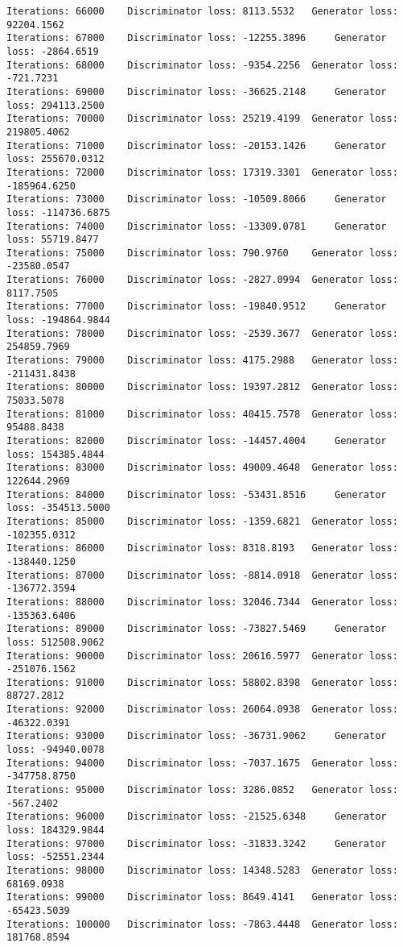 \documentclass[11pt]{article}
\begin{document}
\begin{Verbatim}[commandchars=\\\{\}]
Iterations: 66000	 Discriminator loss: 8113.5532	 Generator loss: 92204.1562
Iterations: 67000	 Discriminator loss: -12255.3896	 Generator loss: -2864.6519
Iterations: 68000	 Discriminator loss: -9354.2256	 Generator loss: -721.7231
Iterations: 69000	 Discriminator loss: -36625.2148	 Generator loss: 294113.2500
Iterations: 70000	 Discriminator loss: 25219.4199	 Generator loss: 219805.4062
Iterations: 71000	 Discriminator loss: -20153.1426	 Generator loss: 255670.0312
Iterations: 72000	 Discriminator loss: 17319.3301	 Generator loss: -185964.6250
Iterations: 73000	 Discriminator loss: -10509.8066	 Generator loss: -114736.6875
Iterations: 74000	 Discriminator loss: -13309.0781	 Generator loss: 55719.8477
Iterations: 75000	 Discriminator loss: 790.9760	 Generator loss: -23580.0547
Iterations: 76000	 Discriminator loss: -2827.0994	 Generator loss: 8117.7505
Iterations: 77000	 Discriminator loss: -19840.9512	 Generator loss: -194864.9844
Iterations: 78000	 Discriminator loss: -2539.3677	 Generator loss: 254859.7969
Iterations: 79000	 Discriminator loss: 4175.2988	 Generator loss: -211431.8438
Iterations: 80000	 Discriminator loss: 19397.2812	 Generator loss: 75033.5078
Iterations: 81000	 Discriminator loss: 40415.7578	 Generator loss: 95488.8438
Iterations: 82000	 Discriminator loss: -14457.4004	 Generator loss: 154385.4844
Iterations: 83000	 Discriminator loss: 49009.4648	 Generator loss: 122644.2969
Iterations: 84000	 Discriminator loss: -53431.8516	 Generator loss: -354513.5000
Iterations: 85000	 Discriminator loss: -1359.6821	 Generator loss: -102355.0312
Iterations: 86000	 Discriminator loss: 8318.8193	 Generator loss: -138440.1250
Iterations: 87000	 Discriminator loss: -8814.0918	 Generator loss: -136772.3594
Iterations: 88000	 Discriminator loss: 32046.7344	 Generator loss: -135363.6406
Iterations: 89000	 Discriminator loss: -73827.5469	 Generator loss: 512508.9062
Iterations: 90000	 Discriminator loss: 20616.5977	 Generator loss: -251076.1562
Iterations: 91000	 Discriminator loss: 58802.8398	 Generator loss: 88727.2812
Iterations: 92000	 Discriminator loss: 26064.0938	 Generator loss: -46322.0391
Iterations: 93000	 Discriminator loss: -36731.9062	 Generator loss: -94940.0078
Iterations: 94000	 Discriminator loss: -7037.1675	 Generator loss: -347758.8750
Iterations: 95000	 Discriminator loss: 3286.0852	 Generator loss: -567.2402
Iterations: 96000	 Discriminator loss: -21525.6348	 Generator loss: 184329.9844
Iterations: 97000	 Discriminator loss: -31833.3242	 Generator loss: -52551.2344
Iterations: 98000	 Discriminator loss: 14348.5283	 Generator loss: 68169.0938
Iterations: 99000	 Discriminator loss: 8649.4141	 Generator loss: -65423.5039
Iterations: 100000	 Discriminator loss: -7863.4448	 Generator loss: 181768.8594

    \end{Verbatim}
\end{document}
